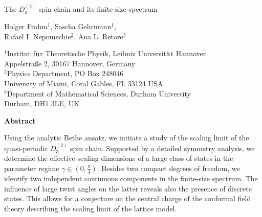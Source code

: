 \documentclass[12pt]{article}
\numberwithin{equation}{section}
\begin{document}
	
	
	\begin{titlepage}
		$\phantom{I}$
		\vspace{2.8cm}
		
		\begin{center}
			\begin{LARGE}
				
				
				{The $D^{(2)}_{3}$ spin chain and its finite-size spectrum}
			\end{LARGE}
			\vspace{1.3cm}
			\begin{large}
				{\bf 
					
					Holger Frahm$^1$, Sascha Gehrmann$^1$,\\ Rafael I. Nepomechie$^2$, Ana L. Retore$^3$}
				
			\end{large}
			
			\vspace{1.cm}
			$^1$Institut f$\ddot{{\rm u}}$r Theoretische Physik, 
			Leibniz Universit$\ddot{{\rm a}}$t Hannover\\
			Appelstra\ss e 2, 30167 Hannover, Germany\\\vspace{0.5cm}
			$^2$Physics Department, PO Box 248046\\
			University of Miami, Coral Gables, FL 33124 USA\\ \vspace{0.5cm}
			$^3$Department of Mathematical Sciences, Durham University\\ Durham, DH1 3LE, UK
			
			
			\vspace{1.0cm}
			
		\end{center}
		
		\begin{center}
			
			\parbox{13cm}{%
				\centerline{\bf Abstract} \vspace{.8cm}
				Using the analytic Bethe ansatz, we initiate a study of the scaling limit of the quasi-periodic $D^{(2)}_3$ spin chain. Supported by a detailed symmetry analysis, we determine the effective scaling dimensions of a large class of states in the parameter regime $\gamma\in (0,\frac{\pi}{4})$. Besides two compact degrees of freedom, we identify two independent continuous components in the finite-size spectrum. The influence of large twist angles on the latter reveals also the presence of discrete states. This allows for a conjecture on the central charge of the conformal field theory describing the scaling limit of the lattice model.}
			
		\end{center}
		
		\vfill
		
	\end{titlepage}
	
\end{document}
